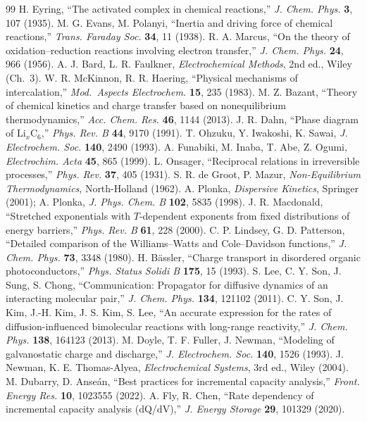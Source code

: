 \documentclass[11pt,a4paper]{article}
\begin{document}
\begin{thebibliography}{99}
 H. Eyring, ``The activated complex in chemical reactions,'' \emph{J. Chem. Phys.} \textbf{3}, 107 (1935).
 M. G. Evans, M. Polanyi, ``Inertia and driving force of chemical reactions,'' \emph{Trans. Faraday Soc.} \textbf{34}, 11 (1938).
 R. A. Marcus, ``On the theory of oxidation--reduction reactions involving electron transfer,'' \emph{J. Chem. Phys.} \textbf{24}, 966 (1956).
 A. J. Bard, L. R. Faulkner, \emph{Electrochemical Methods}, 2nd ed., Wiley (Ch.~3).
 W. R. McKinnon, R. R. Haering, ``Physical mechanisms of intercalation,'' \emph{Mod.\ Aspects Electrochem.} \textbf{15}, 235 (1983).
 M. Z. Bazant, ``Theory of chemical kinetics and charge transfer based on nonequilibrium thermodynamics,'' \emph{Acc. Chem. Res.} \textbf{46}, 1144 (2013).
 J. R. Dahn, ``Phase diagram of Li$_x$C$_6$,'' \emph{Phys. Rev. B} \textbf{44}, 9170 (1991).
 T. Ohzuku, Y. Iwakoshi, K. Sawai, \emph{J. Electrochem. Soc.} \textbf{140}, 2490 (1993).
 A. Funabiki, M. Inaba, T. Abe, Z. Ogumi, \emph{Electrochim. Acta} \textbf{45}, 865 (1999).
 L. Onsager, ``Reciprocal relations in irreversible processes,'' \emph{Phys. Rev.} \textbf{37}, 405 (1931).
 S. R. de Groot, P. Mazur, \emph{Non-Equilibrium Thermodynamics}, North-Holland (1962).
 A. Plonka, \emph{Dispersive Kinetics}, Springer (2001); A. Plonka, \emph{J. Phys. Chem. B} \textbf{102}, 5835 (1998).
 J. R. Macdonald, ``Stretched exponentials with $T$-dependent exponents from fixed distributions of energy barriers,'' \emph{Phys. Rev. B} \textbf{61}, 228 (2000).
 C. P. Lindsey, G. D. Patterson, ``Detailed comparison of the Williams--Watts and Cole--Davidson functions,'' \emph{J. Chem. Phys.} \textbf{73}, 3348 (1980).
 H. B\"assler, ``Charge transport in disordered organic photoconductors,'' \emph{Phys. Status Solidi B} \textbf{175}, 15 (1993).
 S. Lee, C. Y. Son, J. Sung, S. Chong, ``Communication: Propagator for diffusive dynamics of an interacting molecular pair,'' \emph{J. Chem. Phys.} \textbf{134}, 121102 (2011).
 C. Y. Son, J. Kim, J.-H. Kim, J. S. Kim, S. Lee, ``An accurate expression for the rates of diffusion-influenced bimolecular reactions with long-range reactivity,'' \emph{J. Chem. Phys.} \textbf{138}, 164123 (2013).
 M. Doyle, T. F. Fuller, J. Newman, ``Modeling of galvanostatic charge and discharge,'' \emph{J. Electrochem. Soc.} \textbf{140}, 1526 (1993).
 J. Newman, K. E. Thomas-Alyea, \emph{Electrochemical Systems}, 3rd ed., Wiley (2004).
 M. Dubarry, D. Anse\'an, ``Best practices for incremental capacity analysis,'' \emph{Front. Energy Res.} \textbf{10}, 1023555 (2022).
 A. Fly, R. Chen, ``Rate dependency of incremental capacity analysis (dQ/dV),'' \emph{J. Energy Storage} \textbf{29}, 101329 (2020).
\end{thebibliography}
\end{document}
